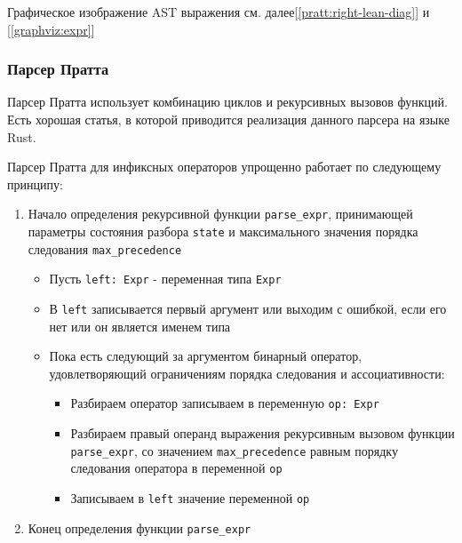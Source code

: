 Графическое изображение AST выражения см. далее[\ref{pratt:right-lean-diag}] и [\ref{graphviz:expr}]

\subsubsection{Парсер Пратта}
\label{pass:parsing:pratt}

Парсер Пратта использует комбинацию циклов и рекурсивных вызовов функций.
Есть хорошая статья, в которой приводится реализация данного парсера на языке Rust\cite{matklad_pratt_parsers}.

Парсер Пратта для инфиксных операторов упрощенно работает по следующему принципу: 

    

\begin{enumerate}
    \item Начало определения рекурсивной функции \verb|parse_expr|, 
    принимающей параметры состояния разбора \verb|state| и максимального значения порядка следования \verb|max_precedence|

    \begin{itemize}
        \item Пусть \verb|left: Expr| - переменная типа \verb|Expr|

        \item В \verb|left| записывается первый аргумент или выходим с ошибкой, если его нет или он является именем типа

        \item\label{pratt:alg:loop} Пока есть следующий за аргументом бинарный оператор, удовлетворяющий ограничениям порядка следования и ассоциативности:

        \begin{itemize}
            \item Разбираем оператор записываем в переменную \verb|op: Expr|

            \item\label{pratt:alg:rec-call} Разбираем правый операнд выражения рекурсивным вызовом функции \verb|parse_expr|, 
            со значением \verb|max_precedence| равным порядку следования оператора в переменной \verb|op|

            \item Записываем в \verb|left| значение переменной \verb|op|
        \end{itemize}
    \end{itemize}

    \item Конец определения функции \verb|parse_expr|
\end{enumerate}


